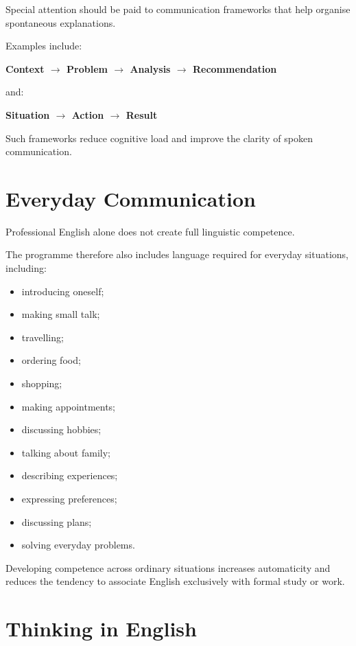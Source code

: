 Special attention should be paid to communication frameworks that help organise spontaneous explanations.

Examples include:

\begin{center}
\textbf{Context $\rightarrow$ Problem $\rightarrow$ Analysis $\rightarrow$ Recommendation}
\end{center}

and:

\begin{center}
\textbf{Situation $\rightarrow$ Action $\rightarrow$ Result}
\end{center}

Such frameworks reduce cognitive load and improve the clarity of spoken communication.

\section*{Everyday Communication}

Professional English alone does not create full linguistic competence.

The programme therefore also includes language required for everyday situations, including:

\begin{itemize}
    \item introducing oneself;
    \item making small talk;
    \item travelling;
    \item ordering food;
    \item shopping;
    \item making appointments;
    \item discussing hobbies;
    \item talking about family;
    \item describing experiences;
    \item expressing preferences;
    \item discussing plans;
    \item solving everyday problems.
\end{itemize}

Developing competence across ordinary situations increases automaticity and reduces the tendency to associate English exclusively with formal study or work.

\section*{Thinking in English}

